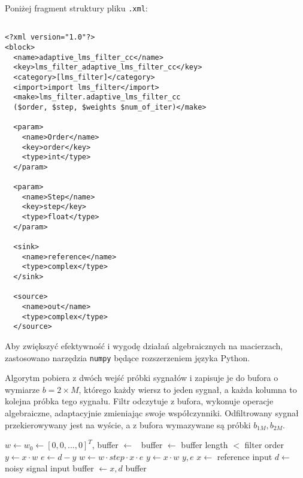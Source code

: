 Poniżej fragment struktury pliku \texttt{.xml}:


\begin{verbatim}

<?xml version="1.0"?>
<block>
  <name>adaptive_lms_filter_cc</name>
  <key>lms_filter_adaptive_lms_filter_cc</key>
  <category>[lms_filter]</category>
  <import>import lms_filter</import>
  <make>lms_filter.adaptive_lms_filter_cc
  ($order, $step, $weights $num_of_iter)</make>

  <param>
    <name>Order</name>
    <key>order</key>
    <type>int</type>
  </param>

  <param>
    <name>Step</name>
    <key>step</key>
    <type>float</type>
  </param>

  <sink>
    <name>reference</name>
    <type>complex</type>
  </sink>

  <source>
    <name>out</name>
    <type>complex</type>
  </source>
\end{verbatim}

Aby zwiększyć efektywność i wygodę działań algebraicznych na macierzach, zastosowano narzędzia \texttt{numpy} będące rozszerzeniem języka Python.

Algorytm pobiera z dwóch wejść próbki sygnałów i zapisuje je do bufora o wymiarze $b = 2 \times M$, którego każdy wiersz to jeden sygnał, a każda kolumna to kolejna próbka tego sygnału. 
Filtr odczytuje z bufora, wykonuje operacje algebraiczne, adaptacyjnie zmieniając swoje współczynniki. 
Odfiltrowany sygnał przekierowywany jest na wyście, a z bufora wymazywane są próbki $b_{1M}, b_{2M}$.
\begin{samepage}
\begin{algorithmic}
\Require $w \gets w_0 \gets [0, 0,...,0]^{T}$,
\State buffer $\gets $ 
    \Repeat\ buffer $\gets$  \Until buffer length $<$ filter order
    \State {}
    \State {}
\EndWhile
{}
    \State $y \gets x \cdot w$
    \State $e \gets d - y$
    \State $w \gets  w \cdot step \cdot x \cdot e$
    \State $y \gets x \cdot w$
    \State \Return $y, e$
\EndFor
\EndFunction
{}
    \State $x \gets$ reference input
    \State $d \gets$ noisy signal input
    \State buffer $\gets x, d$
    \State \Return buffer
\EndFunction
\end{algorithmic}
\end{samepage}


